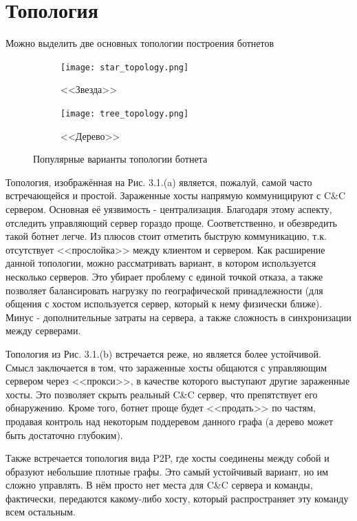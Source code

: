 \documentclass[14pt]{extreport}
\begin{document}
	\newpage
	\section{Топология}
	Можно выделить две основных топологии построения ботнетов
	

	\begin{figure}[H]
	
	\begin{subfigure}{0.5\textwidth}
	\texttt{[image: star\_topology.png]}
	\caption{<<Звезда>>}
	\label{fig:subim1}
	\end{subfigure}
	\begin{subfigure}{0.5\textwidth}
	\texttt{[image: tree\_topology.png]}
	\caption{<<Дерево>>}
	\label{fig:subim2}
	\end{subfigure}
	 
	\caption{Популярные варианты топологии ботнета}
	\label{fig:image2}
	\end{figure}
	Топология, изображённая на Рис. 3.1.(a) является, пожалуй, самой часто встречающейся и простой. Зараженные хосты напрямую коммуницируют с C\&C сервером. Основная её уязвимость - централизация. Благодаря этому аспекту, отследить управляющий сервер гораздо проще. Соответственно, и обезвредить такой ботнет легче. Из плюсов стоит отметить быструю коммуникацию, т.к. отсутствует <<прослойка>> между клиентом и сервером.
	Как расширение данной топологии, можно рассматривать вариант, в котором используется несколько серверов. Это убирает проблему с единой точкой отказа, а также позволяет балансировать нагрузку по географической принадлежности (для общения с хостом используется сервер, который к нему физически ближе). Минус - дополнительные затраты на сервера, а также сложность в синхронизации между серверами.
	
	Топология из Рис. 3.1.(b) встречается реже, но является более устойчивой. Смысл заключается в том, что зараженные хосты общаются с управляющим сервером через <<прокси>>, в качестве которого выступают другие зараженные хосты. Это позволяет скрыть реальный C\&C сервер, что препятствует его обнаружению. Кроме того, ботнет проще будет <<продать>> по частям, продавая контроль над некоторым поддеревом данного графа (а дерево может быть достаточно глубоким).
	
	Также встречается топология вида P2P, где хосты соединены между собой и образуют небольшие плотные графы. Это самый устойчивый вариант, но им сложно управлять. В нём просто нет места для C\&C сервера и команды, фактически, передаются какому-либо хосту, который распространяет эту команду всем остальным.
\end{document}
